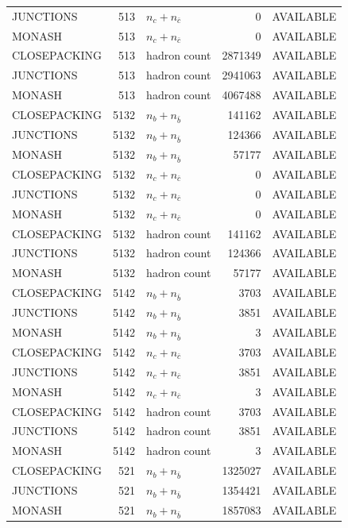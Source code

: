 \begin{landscape}
\begin{longtable}{@{}lrlrl@{}}
JUNCTIONS & 513 & $n_c+n_{\bar c}$ & \num{0} & AVAILABLE \\
MONASH & 513 & $n_c+n_{\bar c}$ & \num{0} & AVAILABLE \\
CLOSEPACKING & 513 & hadron count & \num{2871349} & AVAILABLE \\
JUNCTIONS & 513 & hadron count & \num{2941063} & AVAILABLE \\
MONASH & 513 & hadron count & \num{4067488} & AVAILABLE \\
CLOSEPACKING & 5132 & $n_b+n_{\bar b}$ & \num{141162} & AVAILABLE \\
JUNCTIONS & 5132 & $n_b+n_{\bar b}$ & \num{124366} & AVAILABLE \\
MONASH & 5132 & $n_b+n_{\bar b}$ & \num{57177} & AVAILABLE \\
CLOSEPACKING & 5132 & $n_c+n_{\bar c}$ & \num{0} & AVAILABLE \\
JUNCTIONS & 5132 & $n_c+n_{\bar c}$ & \num{0} & AVAILABLE \\
MONASH & 5132 & $n_c+n_{\bar c}$ & \num{0} & AVAILABLE \\
CLOSEPACKING & 5132 & hadron count & \num{141162} & AVAILABLE \\
JUNCTIONS & 5132 & hadron count & \num{124366} & AVAILABLE \\
MONASH & 5132 & hadron count & \num{57177} & AVAILABLE \\
CLOSEPACKING & 5142 & $n_b+n_{\bar b}$ & \num{3703} & AVAILABLE \\
JUNCTIONS & 5142 & $n_b+n_{\bar b}$ & \num{3851} & AVAILABLE \\
MONASH & 5142 & $n_b+n_{\bar b}$ & \num{3} & AVAILABLE \\
CLOSEPACKING & 5142 & $n_c+n_{\bar c}$ & \num{3703} & AVAILABLE \\
JUNCTIONS & 5142 & $n_c+n_{\bar c}$ & \num{3851} & AVAILABLE \\
MONASH & 5142 & $n_c+n_{\bar c}$ & \num{3} & AVAILABLE \\
CLOSEPACKING & 5142 & hadron count & \num{3703} & AVAILABLE \\
JUNCTIONS & 5142 & hadron count & \num{3851} & AVAILABLE \\
MONASH & 5142 & hadron count & \num{3} & AVAILABLE \\
CLOSEPACKING & 521 & $n_b+n_{\bar b}$ & \num{1325027} & AVAILABLE \\
JUNCTIONS & 521 & $n_b+n_{\bar b}$ & \num{1354421} & AVAILABLE \\
MONASH & 521 & $n_b+n_{\bar b}$ & \num{1857083} & AVAILABLE \\

\end{longtable}
\end{landscape}
